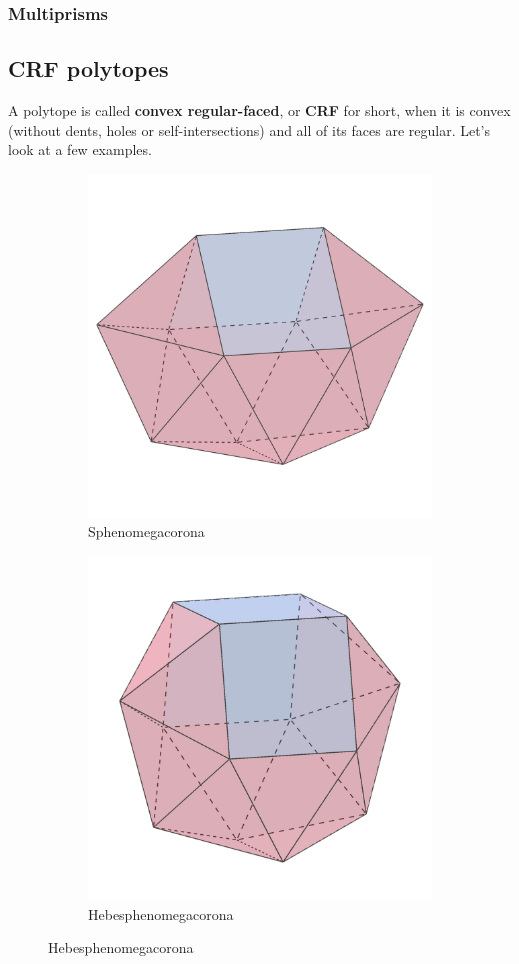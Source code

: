 \documentclass{article}
\begin{document}
\subsubsection{Multiprisms}

\subsection{CRF polytopes}
\label{crf}

A polytope is called \textbf{convex regular-faced}, or \textbf{CRF} for short, when it is convex
(without dents, holes or self-intersections) and all of its faces are regular. Let's look at a few
examples.

\begin{figure}[h]
  \centering
  \begin{subfigure}{.33333\textwidth}
    \centering
    \includegraphics[width=.5\linewidth]{Sphenomegacorona}
    \caption{Sphenomegacorona}
    \label{fig:polyhedra_1}
  \end{subfigure}%
  \begin{subfigure}{.33333\textwidth}
    \centering
    \includegraphics[width=.5\linewidth]{Hebesphenomegacorona}
    \caption{Hebesphenomegacorona}
    \label{fig:polyhedra_2}
  \end{subfigure}%

\end{figure}
\end{document}
